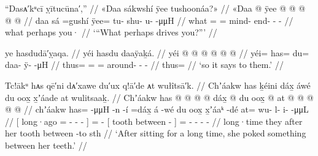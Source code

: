 \ex\label{ex:92-73-what-maybe-drove-you}%
%
\begingl
	\glpreamble	“Dasᴀ′kᵘcī ỵītucūna′,” //
	\glpreamble	«\!Daa sákwshí ÿee tushoonáa?\!» //
	\gla	«\!Daa  @ {}
		ÿee @  @ {} @ {} @ {} @ {} //
	\glb	\pqp{}daa sá =gushí
		ÿee= tu- shu- u-  -μμH //
	\glc	\pqp{}what  =
		= mind- end- -  - //
	\gld	\pqp{}what  \•perhaps
		you·  {} {} {} {} //
	\glft	‘“What perhaps drives you?”’
		//
\endgl
\xe


\ex\label{ex:92-74-so-says-to-them}%
%
\begingl
	\glpreamble	ye hasdudā′ỵaqa. //
	\glpreamble	yéi hasdu daaÿaḵá. //
	\gla	yéi @  @ {} @  @ {} @ {} @ {} //
	\glb	yéi= has= du= daa- ÿ-  -μH //
	\glc	thus= = = around- -  - //
	\gld	thus=  {}  {} {} {} //
	\glft	‘so it says to them.’
		//
\endgl
\xe


\ex\label{ex:92-75-poke-sth-between-teeth}%
%
\begingl
	\glpreamble	Tc!ākᵘ hᴀs qē′ni dᴀ′xawe du′ux q!ā′de ᴀt wułîtsā′k. //
	\glpreamble	Chʼáakw has ḵéini dáx̱ áwé du oox̱ x̱ʼáade at wulitsaaḵ. //
	\gla	{} Chʼáakw has @  @ {} @ {} @ {} {} \•dáx̱ {}  @ {}
		{} du oox̱  @ {} {}
		at @  @ {} @ {} @ {} @ {} //
	\glb	{} chʼáakw has=  -μμH -n -í {} =dáx̱ {} á -wé
		{} du oox̱ x̱ʼáaᵏ -dé {}
		at= wu- l- i-  -μμL //
	\glc	{}[ long·ago =  -
			- - {}] = {}  -
		{}[  tooth between - {}]
		= - - -  - //
	\gld	{} long·time they  {} {} {} {}
			\•after {}  {}
		{} her tooth between -to {}
		sth  {} {} {} {} //
	\glft	‘After sitting for a long time, she poked something between her teeth.’
		//
\endgl
\xe

